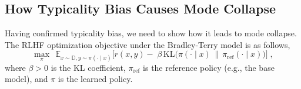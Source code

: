 \subsection{How Typicality Bias Causes Mode Collapse}
Having confirmed typicality bias, we need to show how it leads to mode collapse. The RLHF optimization objective under the Bradley-Terry model is as follows, 
\begin{equation}
\max_{\pi}\ \ \mathbb{E}_{x \sim \mathbb{D}, y\sim \pi(\cdot\mid x)}\!\big[r(x,y) -\;\beta\,\mathrm{KL}\!\big(\pi(\cdot\mid x)\,\|\,\pi_{\mathrm{ref}}(\cdot\mid x)\big) \big]\;,
\label{eq:objective}
\end{equation}
where \(\beta>0\) is the KL coefficient, \(\pi_{\text{ref}}\) is the reference policy (e.g., the base model), and $\pi$ is the learned policy. %
%
%

